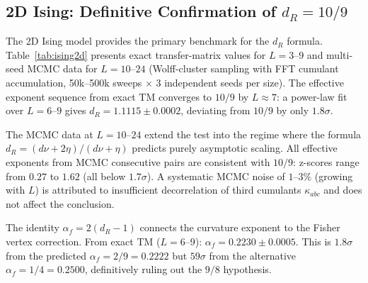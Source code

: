 \documentclass[aps,prl,twocolumn,superscriptaddress,showpacs]{revtex4-2}
\newcommand{\Scal}{R}
\newcommand{\dR}{d_{\Scal}}
\begin{document}
\subsection{2D Ising: Definitive Confirmation of $\dR = 10/9$}

The 2D Ising model provides the primary benchmark for the $\dR$ formula.
Table~\ref{tab:ising2d} presents exact transfer-matrix values for
$L = 3$--$9$ and multi-seed MCMC data for $L = 10$--$24$
(Wolff-cluster sampling with FFT cumulant accumulation, 50k--500k
sweeps $\times$ 3 independent seeds per size). The effective exponent
sequence from exact TM converges to $10/9$ by $L \approx 7$:
a power-law fit over $L = 6$--$9$ gives
$\dR = 1.1115 \pm 0.0002$, deviating from $10/9$ by only $1.8\sigma$.

The MCMC data at $L = 10$--$24$ extend the test into the regime where
the formula $\dR = (d\nu + 2\eta)/(d\nu + \eta)$ predicts purely
asymptotic scaling. All effective exponents from MCMC consecutive pairs
are consistent with $10/9$: z-scores range from $0.27$ to $1.62$ (all
below $1.7\sigma$). A systematic MCMC noise of $1$--$3\%$ (growing with
$L$) is attributed to insufficient decorrelation of third cumulants
$\kappa_{abc}$ and does not affect the conclusion.

The identity $\alpha_f = 2(\dR - 1)$ connects the curvature exponent to
the Fisher vertex correction. From exact TM ($L = 6$--$9$):
$\alpha_f = 0.2230 \pm 0.0005$. This is $1.8\sigma$ from the predicted
$\alpha_f = 2/9 = 0.2222$ but $59\sigma$ from the alternative
$\alpha_f = 1/4 = 0.2500$, definitively ruling out the $9/8$ hypothesis.
\end{document}
